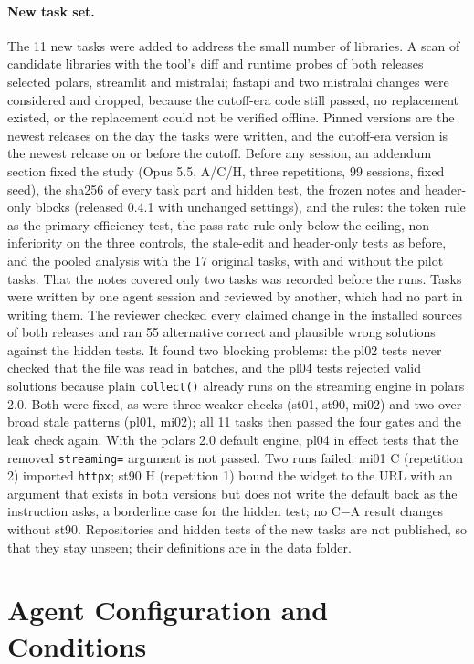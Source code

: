 \documentclass[11pt]{article}
\newcommand{\code}[1]{\texttt{#1}}
\begin{document}
\paragraph{New task set.}
The 11 new tasks were added to address the small number of libraries.
A scan of candidate libraries with the tool's diff and runtime probes of both releases selected polars, streamlit and mistralai; fastapi and two mistralai changes were considered and dropped, because the cutoff-era code still passed, no replacement existed, or the replacement could not be verified offline.
Pinned versions are the newest releases on the day the tasks were written, and the cutoff-era version is the newest release on or before the cutoff.
Before any session, an addendum section fixed the study (Opus 5.5, A/C/H, three repetitions, 99 sessions, fixed seed), the sha256 of every task part and hidden test, the frozen notes and header-only blocks (released 0.4.1 with unchanged settings), and the rules: the token rule as the primary efficiency test, the pass-rate rule only below the ceiling, non-inferiority on the three controls, the stale-edit and header-only tests as before, and the pooled analysis with the 17 original tasks, with and without the pilot tasks.
That the notes covered only two tasks was recorded before the runs.
Tasks were written by one agent session and reviewed by another, which had no part in writing them.
The reviewer checked every claimed change in the installed sources of both releases and ran 55 alternative correct and plausible wrong solutions against the hidden tests.
It found two blocking problems: the pl02 tests never checked that the file was read in batches, and the pl04 tests rejected valid solutions because plain \code{collect()} already runs on the streaming engine in polars 2.0.
Both were fixed, as were three weaker checks (st01, st90, mi02) and two over-broad stale patterns (pl01, mi02); all 11 tasks then passed the four gates and the leak check again.
With the polars 2.0 default engine, pl04 in effect tests that the removed \code{streaming=} argument is not passed.
Two runs failed: mi01 C (repetition 2) imported \code{httpx}; st90 H (repetition 1) bound the widget to the URL with an argument that exists in both versions but does not write the default back as the instruction asks, a borderline case for the hidden test; no C$-$A result changes without st90.
Repositories and hidden tests of the new tasks are not published, so that they stay unseen; their definitions are in the data folder.

\section{Agent Configuration and Conditions}
\label{app:conditions}
\end{document}
